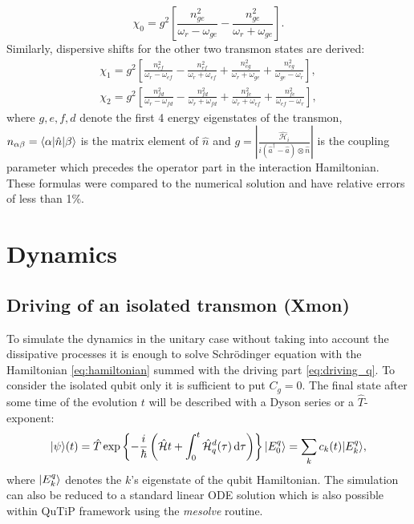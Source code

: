 \documentclass[12pt]{report}
\newcommand{\diff}{\,\mathrm{d}}
\DeclarePairedDelimiter\bra{\langle}{\rvert}
\DeclarePairedDelimiter\ket{\lvert}{\rangle}
\newcommand{\rbrkt}[1]{\left( #1 \right)}
\newcommand{\sbrkt}[1]{\left[ #1 \right]}
\numberwithin{equation}{section}
\begin{document}
\begin{equation}
\chi_0 = g^2\sbrkt{\frac{n_{ge}^2}{\omega_r - \omega_{ge}}-\frac{n_{ge}^2}{\omega_r + \omega_{ge}}}.
\end{equation}
Similarly, dispersive shifts for the other two transmon states are derived:
\begin{gather*}
\chi_1 = g^2\sbrkt{\frac{n_{ef}^2}{\omega_r - \omega_{ef}} - \frac{n_{ef}^2}{\omega_r + \omega_{ef}} + \frac{n_{eg}^2}{\omega_r + \omega_{ge}}+ \frac{n_{eg}^2}{\omega_{ge}-\omega_r }},\\
\chi_2 = g^2\sbrkt{\frac{n_{fd}^2}{\omega_r - \omega_{fd}} -\frac{n_{fd}^2}{\omega_r + \omega_{fd}} + \frac{n_{fe}^2}{\omega_r + \omega_{ef}}+ \frac{n_{fe}^2}{\omega_{ef}-\omega_r}},
\end{gather*}
where $g, e, f, d$ denote the first 4 energy eigenstates of the transmon, $n_{\alpha\beta} = \bra{\alpha} \hat n \ket{\beta}$ is the matrix element of $\hat n$ and $g = \left.|\frac{\mathcal{\hat H}_i}{i(\hat a^\dag  - \hat a)\otimes \hat n}|\right.$ is the coupling parameter which precedes the operator part in the interaction Hamiltonian. These formulas were compared to the numerical solution and have relative errors of less than 1\%.
\chapter{Dynamics}

\section{Driving of an isolated transmon (Xmon)}

To simulate the dynamics in the unitary case without taking into account the dissipative processes it is enough to solve Schrödinger equation with the Hamiltonian \eqref{eq:hamiltonian} summed with the driving part \eqref{eq:driving_q}. To consider the isolated qubit only it is sufficient to put $C_g = 0$. The final state after some time of the evolution $t$ will be described with a Dyson series or a $\hat T$-exponent:
\begin{equation}
\ket{\psi}(t) = \hat T \exp\left\{-\frac{i}{\hbar} \rbrkt{\mathcal{\hat H}t + \int_0^t \mathcal{\hat H}_q^d(\tau) \diff\tau}\right\} \ket{E_0^q}= \sum_k c_k(t) \ket{E^q_k},
\end{equation} 
where $\ket{E_k^q}$ denotes the $k$'s eigenstate of the qubit Hamiltonian. The simulation can also be reduced to a standard linear ODE solution which is also possible within QuTiP framework using the \textit{mesolve} routine.
\end{document}

